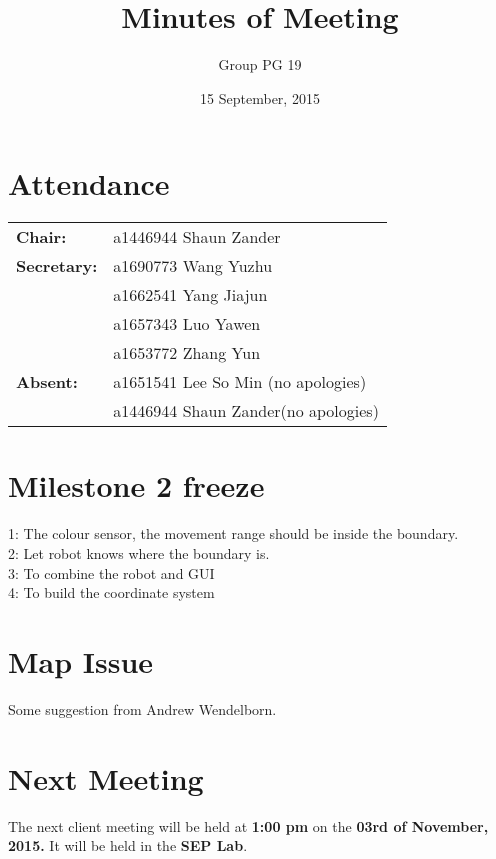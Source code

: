 \documentclass[a4paper]{article}
\title{Minutes of Meeting}
\author{Group PG 19}
\date{15 September, 2015}
\begin{document}
\maketitle
\section*{Attendance}
\begin{tabular}{l l}
\textbf{Chair:} 
&a1446944 Shaun Zander\\
\textbf{Secretary:}&a1690773 Wang Yuzhu\\
&a1662541 Yang Jiajun\\
&a1657343 Luo Yawen\\
&a1653772 Zhang Yun\\
\textbf{Absent:}&a1651541 Lee So Min (no apologies)\\ &a1446944 Shaun Zander(no apologies)
\end{tabular}

\section{Milestone 2 freeze}
1: The colour sensor, the movement range should be inside the boundary.\\
2: Let robot knows where the boundary is.\\
3: To combine the robot and GUI\\
4: To build the coordinate system\\

\section{Map Issue}
Some suggestion from Andrew Wendelborn.

\section{Next Meeting}
The next client meeting will be held at \textbf{1:00 pm} on the \textbf{03rd of November, 2015.} It will be held in the \textbf{SEP Lab}.
\end{document}
